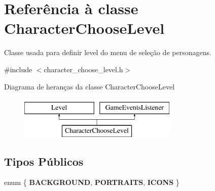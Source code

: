 \hypertarget{classCharacterChooseLevel}{}\section{Referência à classe Character\+Choose\+Level}
\label{classCharacterChooseLevel}


Classe usada para definir level do menu de seleção de personagens.  




{\ttfamily \#include $<$character\+\_\+choose\+\_\+level.\+h$>$}

Diagrama de heranças da classe Character\+Choose\+Level\begin{figure}[H]
\begin{center}
\leavevmode
\includegraphics[height=2.000000cm]{classCharacterChooseLevel}
\end{center}
\end{figure}
\subsection*{Tipos Públicos}
\begin{DoxyCompactItemize}
\item 
\mbox{\label{classCharacterChooseLevel_a88404336608984c1a3d735e6d5ebd5cf}} 
enum \{ {\bfseries B\+A\+C\+K\+G\+R\+O\+U\+ND}, 
{\bfseries P\+O\+R\+T\+R\+A\+I\+TS}, 
{\bfseries I\+C\+O\+NS}
 \}
\end{DoxyCompactItemize}
